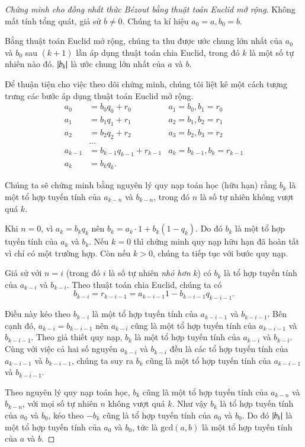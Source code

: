 \begin{proof}[Chứng minh cho đồng nhất thức B\'{e}zout bằng thuật toán Euclid mở rộng]
    Không mất tính tổng quát, giả sử $b\ne 0$. Chúng ta kí hiệu $a_{0} = a, b_{0} = b$.

    Bằng thuật toán Euclid mở rộng, chúng ta thu được ước chung lớn nhất của $a_{0}$ và $b_{0}$ sau $(k+1)$ lần áp dụng thuật toán chia Euclid, trong đó $k$ là một số tự nhiên nào đó. $\left\vert{b_{k}}\right\vert$ là ước chung lớn nhất của $a$ và $b$.

    Để thuận tiện cho việc theo dõi chứng minh, chúng tôi liệt kê một cách tượng trưng các bước áp dụng thuật toán Euclid mở rộng.
    \begin{align*}
        a_{0}   & = b_{0} q_{0} + r_{0}       & a_{1} = b_{0}, b_{1} = r_{0}     \\
        a_{1}   & = b_{1} q_{1} + r_{1}       & a_{2} = b_{1}, b_{2} = r_{1}     \\
        a_{2}   & = b_{2} q_{2} + r_{2}       & a_{3} = b_{2}, b_{3} = r_{2}     \\
                & \ldots                                                         \\
        a_{k-1} & = b_{k-1} q_{k-1} + r_{k-1} & a_{k} = b_{k-1}, b_{k} = r_{k-1} \\
        a_{k}   & = b_{k} q_{k}.
    \end{align*}

    Chúng ta sẽ chứng minh bằng nguyên lý quy nạp toán học (hữu hạn) rằng $b_{k}$ là một tổ hợp tuyến tính của $a_{k-n}$ và $b_{k-n}$, trong đó $n$ là số tự nhiên không vượt quá $k$.

    Khi $n = 0$, vì $a_{k} = b_{k} q_{k}$ nên $b_{k} = a_{k}\cdot 1 + b_{k} (1 - q_{k})$.  Do đó $b_{k}$ là một tổ hợp tuyến tính của $a_{k}$ và $b_{k}$. Nếu $k = 0$ thì chứng minh quy nạp hữu hạn đã hoàn tất vì chỉ có một trường hợp. Còn nếu $k > 0$, chúng ta tiếp tục với bước quy nạp.

    Giả sử với $n = i$ (trong đó $i$ là số tự nhiên \textit{nhỏ hơn} $k$) có $b_{k}$ là tổ hợp tuyến tính của $a_{k-i}$ và $b_{k-i}$. Theo thuật toán chia Euclid, chúng ta có
    \[
        b_{k-i} = r_{k-i-1} = a_{k-i-1} 1 - b_{k-i-1} q_{k-i-1}.
    \]

    Điều này kéo theo $b_{k-i}$ là một tổ hợp tuyến tính của $a_{k-i-1}$ và $b_{k-i-1}$. Bên cạnh đó, $a_{k-i} = b_{k-i-1}$ nên $a_{k-i}$ cũng là một tổ hợp tuyến tính của $a_{k-i-1}$ và $b_{k-i-1}$. Theo giả thiết quy nạp, $b_{k}$ là một tổ hợp tuyến tính của $a_{k-i}$ và $b_{k-i}$. Cùng với việc cả hai số nguyên $a_{k-i}$ và $b_{k-i}$ đều là các tổ hợp tuyến tính của $a_{k-i-1}$ và $b_{k-i-1}$, chúng ta suy ra $b_{k}$ cũng là một tổ hợp tuyến tính của $a_{k-i-1}$ và $b_{k-i-1}$.

    Theo nguyên lý quy nạp toán học, $b_{k}$ cũng là một tổ hợp tuyến tính của $a_{k-n}$ và $b_{k-n}$, với mọi số tự nhiên $n$ không vượt quá $k$. Như vậy $b_{k}$ là tổ hợp tuyến tính của $a_{0}$ và $b_{0}$, kéo theo $-b_{k}$ cũng là tổ hợp tuyến tính của $a_{0}$ và $b_{0}$. Do đó $\left\vert{b_{k}}\right\vert$ là một tổ hợp tuyến tính của $a_{0}$ và $b_{0}$, tức là $\text{gcd}(a, b)$ là một tổ hợp tuyến tính của $a$ và $b$.
\end{proof}

